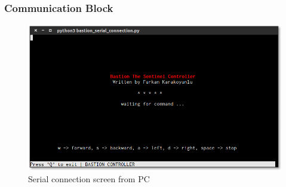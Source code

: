 \documentclass{beamer}
\begin{document}
 \begin{frame}
  \frametitle{Communication Block}
  \begin{figure}[h!]
    \begin{center}
      \includegraphics[scale=0.35]{serial_pc}
      \caption{Serial connection screen from PC}
    \end{center}
  \end{figure}
 \end{frame}
 
\end{document}
